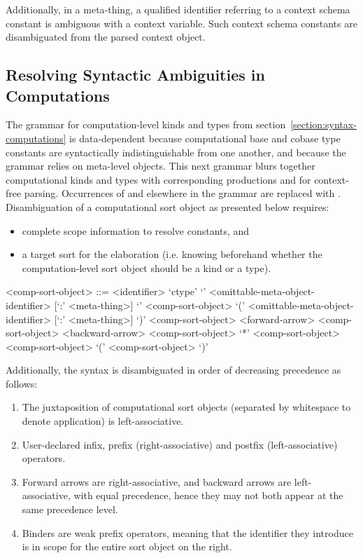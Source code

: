 Additionally, in a meta-thing, a qualified identifier referring to a context schema constant is ambiguous with a context variable.
Such context schema constants are disambiguated from the parsed context object.

\subsection{Resolving Syntactic Ambiguities in Computations}

The grammar for computation-level kinds and types from section~\ref{section:syntax-computations} is data-dependent because computational base and cobase type constants are syntactically indistinguishable from one another, and because the grammar relies on meta-level objects.
This next grammar blurs together computational kinds and types with corresponding productions  and  for context-free parsing.
Occurrences of  and  elsewhere in the grammar are replaced with .
Disambiguation of a computational sort object as presented below requires:
\begin{itemize}
\item complete scope information to resolve constants, and
\item a target sort for the elaboration (i.e. knowing beforehand whether the computation-level sort object should be a kind or a type).
\end{itemize}

\begin{grammar}
<comp-sort-object> ::= <identifier>
\alt `ctype'
\alt `{' <omittable-meta-object-identifier> [`:' <meta-thing>] `}' <comp-sort-object>
\alt `(' <omittable-meta-object-identifier> [`:' <meta-thing>] `)' <comp-sort-object>
 <forward-arrow> <comp-sort-object>
 <backward-arrow> <comp-sort-object>
 `*' <comp-sort-object>
 <comp-sort-object>
\alt `(' <comp-sort-object> `)'
\end{grammar}

Additionally, the syntax is disambiguated in order of decreasing precedence as follows:

\begin{enumerate}
\item The juxtaposition of computational sort objects (separated by whitespace to denote application) is left-associative.
\item User-declared infix, prefix (right-associative) and postfix (left-associative) operators.
\item Forward arrows are right-associative, and backward arrows are left-associative, with equal precedence, hence they may not both appear at the same precedence level.
\item Binders are weak prefix operators, meaning that the identifier they introduce is in scope for the entire sort object on the right.
\end{enumerate}
